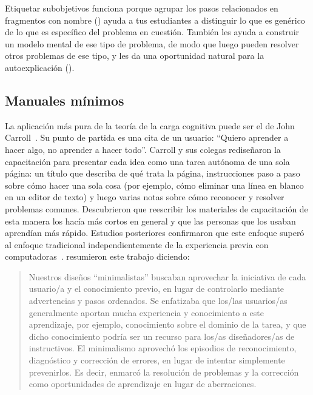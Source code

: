 Etiquetar sub\-objetivos funciona porque agrupar los pasos relacionados 
en fragmentos con nombre ()
ayuda a tus estudiantes a distinguir lo que es genérico de lo que es específico del problema en cuestión.
También les ayuda a construir un modelo mental de ese tipo de problema,
de modo que luego pueden resolver otros problemas de ese tipo,
y les da una oportunidad natural para la auto\-explicación ().

\subsection*{Manuales mínimos}

La aplicación más pura de la teoría de la carga cognitiva puede ser el  de
John Carroll~\cite{Carr1987,Carr2014}.
Su punto de partida es una cita de un usuario: ``Quiero aprender a hacer algo, no aprender a hacer todo''.
Carroll y sus colegas rediseñaron la capacitación para presentar cada idea como una tarea autónoma de una sola página:
un título que describa de qué trata la página,
instrucciones paso a paso sobre cómo hacer una sola cosa
(por ejemplo, cómo eliminar una línea en blanco en un editor de texto)
y luego varias notas sobre cómo reconocer y resolver problemas comunes.
Descubrieron que reescribir los materiales de capacitación de esta manera los hacía más cortos en general
y que las personas que los usaban aprendían más rápido.
Estudios posteriores confirmaron que este enfoque superó al enfoque tradicional
independientemente de la experiencia previa con computadoras~\cite{Lazo1993}.
\cite{Carr2014} resumieron este trabajo diciendo:

\begin{quote}

  Nuestros diseños ``minimalistas'' buscaban aprovechar la iniciativa de cada usuario/a y el conocimiento previo,
  en lugar de controlarlo mediante advertencias y pasos ordenados.
  Se enfatizaba que los/las usuarios/as generalmente aportan mucha experiencia y conocimiento a este aprendizaje,
  por ejemplo,
  conocimiento sobre el dominio de la tarea,
  y que dicho conocimiento podría ser un recurso para los/as diseñadores/as de instructivos.
  El minimalismo aprovechó los episodios de reconocimiento, diagnóstico y corrección de errores,
  en lugar de intentar simplemente prevenirlos. Es decir,
  enmarcó la resolución de problemas y la corrección como oportunidades de aprendizaje en lugar de aberraciones.

\end{quote}


